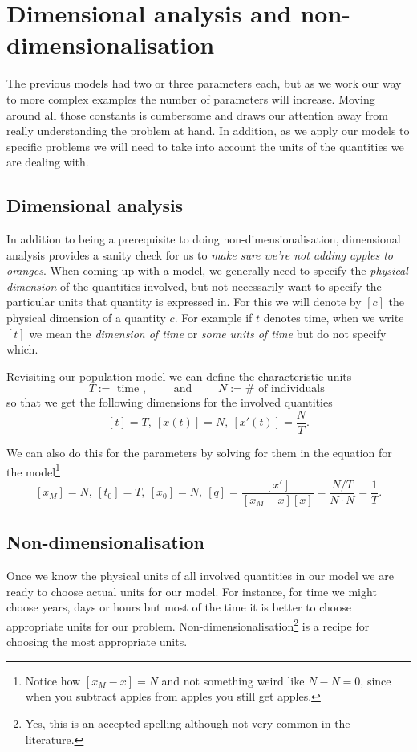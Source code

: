 \section{Dimensional analysis and non-dimensionalisation}

The previous models had two or three parameters each, but as we work our way to
more complex examples the number of parameters will increase. Moving around all
those constants is cumbersome and draws our attention away from really
understanding the problem at hand. In addition, as we apply our models to
specific problems we will need to take into account the units of the quantities
we are dealing with.

\subsection{Dimensional analysis}

In addition to being a prerequisite to doing non-dimensionalisation,
dimensional analysis provides a sanity check for us to \textit{make sure we're
not adding apples to oranges}. When coming up with a model, we generally need
to specify the \textit{physical dimension} of the quantities involved, but not
necessarily want to specify the particular units that quantity is expressed in.
For this we will denote by $[c]$ the physical dimension of a quantity $c$. For
example if $t$ denotes time, when we write $[t]$ we mean the \textit{dimension
of time} or \textit{some units of time} but do not specify which.

Revisiting our population model we can define the characteristic units
\[
  T := \text{ time },\qquad \text{ and } \qquad N := \# \text{ of individuals }
\]
so that we get the following dimensions for the involved quantities
\[
  [t] = T,\ [x(t)] = N,\ [x'(t)] = \frac{N}{T}.
\]

We can also do this for the parameters by solving for them in the equation for
the model\footnote{Notice how $[x_M - x] = N$ and not something weird like $N -
N = 0$, since when you subtract apples from apples you still get apples.}
\[
  [x_M] = N,\ [t_0] = T,\ [x_0] = N,\ 
  [q] = \frac{[x']}{[x_M - x][x]} = \frac{N / T}{N \cdot N} = \frac{1}{T}. 
\]

\subsection{Non-dimensionalisation}

Once we know the physical units of all involved quantities in our model we are
ready to choose actual units for our model. For instance, for time we might
choose years, days or hours but most of the time it is better to choose
appropriate units for our problem. Non-dimensionalisation\footnote{Yes, this is
an accepted spelling although not very common in the literature.} is a recipe
for choosing the most appropriate units.

